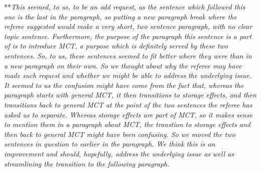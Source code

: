 \documentclass[letterpaper,11pt]{article}
\begin{document}
\noindent ***\emph{This seemed, to us, to be an odd request, as the sentence which followed this one is the 
last in the paragraph, so putting a new paragraph break where the referee suggested would make a very short, two
sentence paragraph, with no clear topic sentence. Furthermore, the purpose of the paragraph this sentence
is a part of is to introduce MCT, a purpose which is definitely served by these two sentences. So, to us,
these sentences seemed to fit better where they were than in a new paragraph on their own. 
So we thought about why the referee may have made such
request and whether we might be able to address the underlying issue. It seemed to us the confusion might have come
from the fact that, whereas the paragraph starts with general MCT, it then transitions to storage effects, and 
then transitions back
to general MCT at the point of the two sentences the referee has asked us to separate. 
Whereas storage effects are part of MCT, so it makes sense to mention them in a paragraph about MCT,
the transtion to storage effects and then back to general MCT might have been confusing. So we moved the
two sentences in question to earlier in the paragraph. We think this is an improvement and should, hopefully,
address the underlying issue as well as streamlining the transition to the following paragraph.} 
\end{document}
